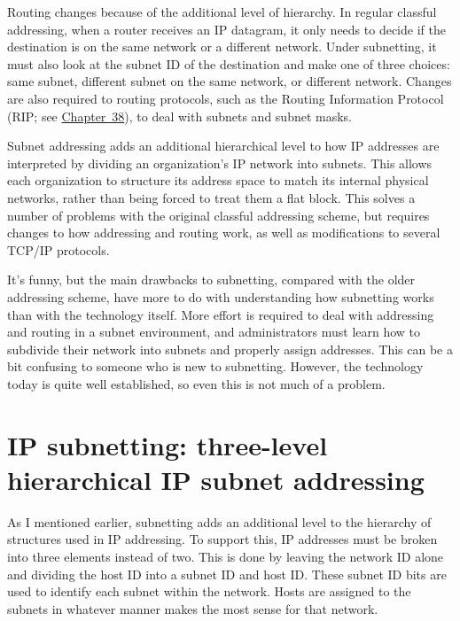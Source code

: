 Routing changes because of the additional level of hierarchy. In regular
classful addressing, when a router receives an IP datagram, it only
needs to decide if the destination is on the same network or a different
network. Under subnetting, it must also look at the subnet ID of the
destination and make one of three choices: same subnet, different subnet
on the same network, or different network. Changes are also required to
routing protocols, such as the Routing Information Protocol (RIP; see
\protect\hyperlink{ch38.html}{Chapter~38}), to deal with subnets and
subnet masks.


\begin{keyconcept}
Subnet addressing adds an additional hierarchical level to how IP addresses are interpreted by dividing an organization's IP network into subnets.
This allows each organization to structure its address space to match its internal physical networks, rather than being forced to treat them a flat block.
This solves a number of problems with the original classful addressing scheme, but requires changes to how addressing and routing work, as well as modifications to several TCP/IP protocols.
\end{keyconcept}

It's funny, but the main drawbacks to subnetting, compared with the
older addressing scheme, have more to do with understanding how
subnetting works than with the technology itself. More effort is
required to deal with addressing and routing in a subnet environment,
and administrators must learn how to subdivide their network into
subnets and properly assign addresses. This can be a bit confusing to
someone who is new to subnetting. However, the technology today is quite
well established, so even this is not much of a problem.


\section{IP subnetting: three-level hierarchical IP subnet addressing}

As I mentioned earlier, subnetting adds an additional level to the hierarchy
of structures used in IP addressing. To support this, IP addresses must
be broken into three elements instead of two. This is done by leaving
the network ID alone and dividing the host ID into a subnet ID and host
ID. These subnet ID bits are used to identify each subnet within the
network. Hosts are assigned to the subnets in whatever manner makes the
most sense for that network.

